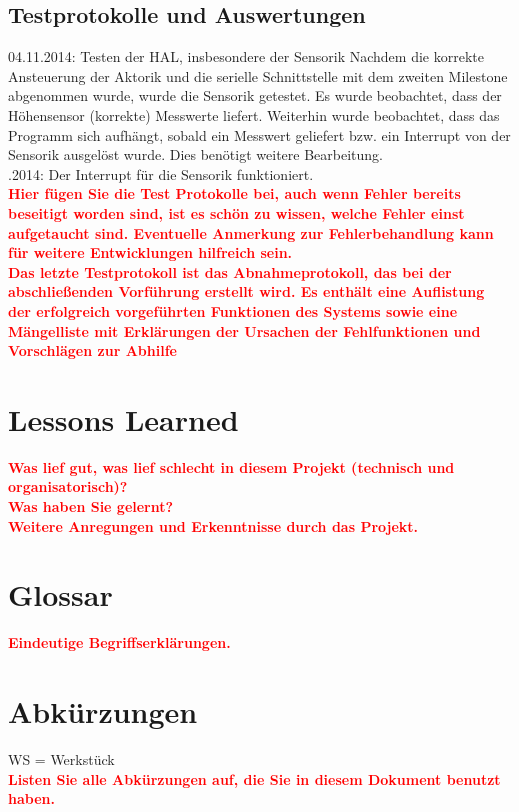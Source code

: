 \documentclass[oneside,a4paper,titlepage]{scrartcl} %
\begin{document}
\subsection{Testprotokolle und Auswertungen}
04.11.2014: Testen der HAL, insbesondere der Sensorik \newline
Nachdem die korrekte Ansteuerung der Aktorik und die serielle Schnittstelle mit dem zweiten Milestone abgenommen wurde, wurde die Sensorik getestet. Es wurde beobachtet, dass der Höhensensor (korrekte) Messwerte liefert. Weiterhin wurde beobachtet, dass das Programm sich aufhängt, sobald ein Messwert geliefert bzw. ein Interrupt von der Sensorik ausgelöst wurde. Dies benötigt weitere Bearbeitung.\\
.2014: Der Interrupt für die Sensorik funktioniert.\\
\newline
\textcolor{red}{\textbf{Hier fügen Sie die Test Protokolle bei, auch wenn Fehler bereits beseitigt
worden sind, ist es schön zu wissen, welche Fehler einst aufgetaucht sind.
Eventuelle Anmerkung zur Fehlerbehandlung kann für weitere Entwicklungen hilfreich sein.\\
Das letzte Testprotokoll ist das Abnahmeprotokoll, das bei der abschließenden Vorführung erstellt
wird. Es enthält eine Auflistung der erfolgreich vorgeführten Funktionen des Systems sowie eine
Mängelliste mit Erklärungen der Ursachen der Fehlfunktionen und Vorschlägen zur Abhilfe}}

\section{Lessons Learned}
\textcolor{red}{\textbf{Was lief gut, was lief schlecht in diesem Projekt (technisch und organisatorisch)?\\
Was haben Sie gelernt?\\
Weitere Anregungen und Erkenntnisse durch das Projekt.}}

\newpage

\section{Glossar}
\textcolor{red}{\textbf{Eindeutige Begriffserklärungen.}}

\section{Abkürzungen}
WS = Werkstück\\
\textcolor{red}{\textbf{Listen Sie alle Abkürzungen auf, die Sie in diesem Dokument benutzt haben.}}
\end{document}
